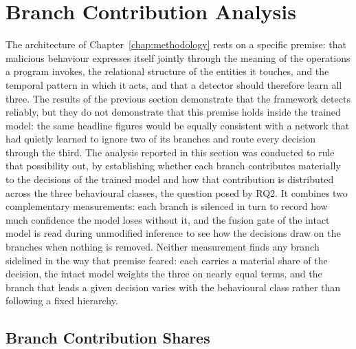 \documentclass[%
    BCOR=10mm,
    DIV=13,
    toc=bibliography,
    toc=listof,
    oneside,
    12pt,
]{scrbook}
\begin{document}
\section{Branch Contribution Analysis}
\label{sec:component_attribution}

The architecture of Chapter~\ref{chap:methodology} rests on a specific premise:
that malicious behaviour expresses itself jointly through the meaning of the
operations a program invokes, the relational structure of the entities it
touches, and the temporal pattern in which it acts, and that a detector should
therefore learn all three. The results of the previous section demonstrate that
the framework detects reliably, but they do not demonstrate that this premise
holds inside the trained model: the same headline figures would be equally
consistent with a network that had quietly learned to ignore two of its
branches and route every decision through the third. The analysis reported in
this section was conducted to rule that possibility out, by establishing
whether each branch contributes materially to the decisions of the trained
model and how that contribution is distributed across the three behavioural
classes, the question posed by RQ2. It combines two complementary measurements:
each branch is silenced in turn to record how much confidence the model loses
without it, and
the fusion gate of the intact model is read during unmodified inference to see
how the decisions draw on the branches when nothing is removed. Neither
measurement finds any branch sidelined in the way that premise feared: each carries a
material share of the decision, the intact model weights the three on nearly
equal terms, and
the branch that leads a given decision varies with the behavioural class
rather than following a fixed hierarchy.

\subsection{Branch Contribution Shares}
\label{subsec:branch_contributions}
\end{document}

